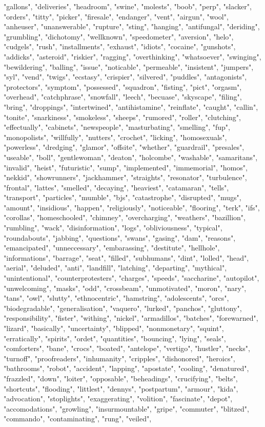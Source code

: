 "gallons", "deliveries", "headroom", "swine", "molests", "boob", "perp", "slacker", "orders", "titty", "picker", "firesale", "endanger", "vent", "airgun", "wool", "anheuser", "unanswerable", "rupture", "sting", "hanging", "antifungal", "deriding", "grumbling", "dichotomy", "wellknown", "speedometer", "aversion", "helo", "cudgels", "rush", "installments", "exhaust", "idiots", "cocaine", "gunshots", "addicks", "asteroid", "riskier", "ragging", "overthinking", "whatsoever", "swinging", "bewildering", "balling", "issue", "noticable", "permeable", "insistent", "jumpers", "syl", "vend", "twigs", "ecstasy", "crispier", "silvered", "puddles", "antagonists", "protectors", "symptom", "possessed", "squadron", "fisting", "pict", "orgasm", "overhead", "catchphrase", "snowfall", "leech", "becuase", "skyscape", "filing", "bring", "droppings", "intertwined", "antihistamine", "reinflate", "caught", "callin", "tonite", "snarkiness", "smokeless", "sheeps", "rumored", "roller", "clutching", "effectually", "cabinets", "newspeople", "masturbating", "smelling", "fup", "monopolists", "willfully", "nutters", "crochet", "licking", "homosexuals", "powerless", "dredging", "glamor", "offsite", "whether", "guardrail", "presales", "useable", "boll", "gentlewoman", "deaton", "holcombe", "washable", "samaritans", "invalid", "heist", "futuristic", "sump", "implemented", "immemorial", "homos", "nekkid", "showrunners", "jackhammer", "straights", "resonator", "turbulence", "frontal", "lattes", "smelled", "decaying", "heaviest", "catamaran", "tells", "transport", "particles", "mumble", "bjs", "catastrophe", "disrupted", "mugs", "amount", "insidious", "happen", "religiously", "noticeable", "flooring", "terk", "ifs", "corollas", "homeschooled", "chimney", "overcharging", "weathers", "bazillion", "rumbling", "wack", "disinformation", "logs", "obliviousness", "typical", "roundabouts", "jabbing", "questions", "swans", "gasing", "dam", "reasons", "emancipated", "unneccessary", "embarassing", "destitute", "hellhole", "informations", "barrage", "seat", "filled", "subhumans", "dint", "lolled", "head", "aerial", "deluded", "anti", "landfill", "latching", "departing", "mythical", "unintentional", "counterprotesters", "charges", "speeds", "saccharine", "autopilot", "unwelcoming", "masks", "odd", "crossbeam", "unmotivated", "moron", "nary", "tans", "owl", "slutty", "ethnocentric", "hamstring", "adolescents", "orcs", "biodegradable", "generalisation", "vaquero", "lurked", "panchos", "gluttony", "responsibility", "fister", "withing", "nickel", "armadillos", "batches", "forewarned", "lizard", "basically", "uncertainty", "blipped", "nonmonetary", "squint", "erratically", "spirits", "ordet", "quantities", "bouncing", "lying", "seals", "comforters", "bane", "crocs", "boated", "antelope", "vertigo", "hustler", "necks", "turnoff", "proofreaders", "inhumanity", "cripples", "dishonored", "heroics", "bathrooms", "robot", "accident", "lapping", "apostate", "cooling", "denatured", "frazzled", "down", "loiter", "opposable", "beheadings", "crucifying", "belts", "shortcuts", "flooding", "littlest", "dennys", "postpartum", "armour", "kida", "advocation", "stoplights", "exaggerating", "volition", "fascinate", "depot", "accomodations", "growling", "insurmountable", "gripe", "commuter", "blitzed", "commando", "contaminating", "rung", "veiled", 